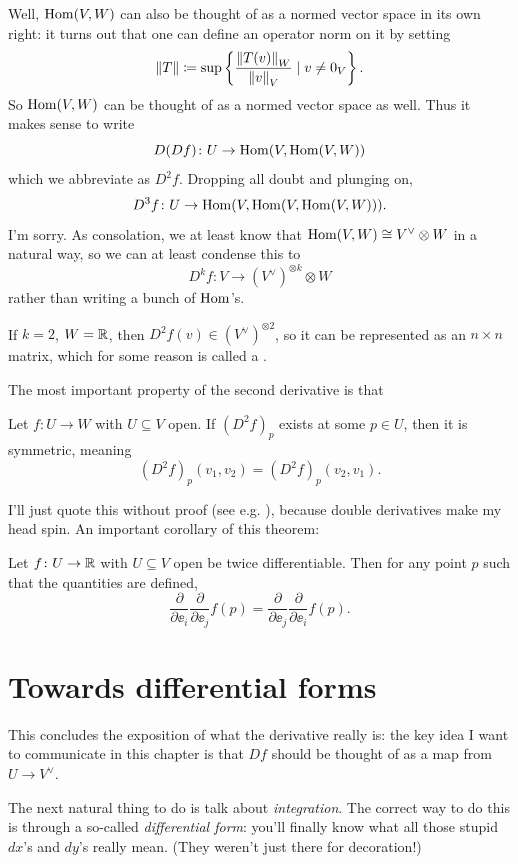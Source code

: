 Well, $\operatorname{Hom}(V,W)$ can also be thought of as a normed vector space in its own right:
it turns out that one can define an operator norm on it by setting
\[ \left\lVert T \right\rVert \coloneqq \sup \left\{ \frac{\left\lVert T(v) \right\rVert_W}{\left\lVert v \right\rVert_V} \mid v \neq 0_V \right\}. \]
So $\operatorname{Hom}(V,W)$ can be thought of as a normed vector space as well.
Thus it makes sense to write
\[ D(Df) \colon U \to \operatorname{Hom}(V,\operatorname{Hom}(V,W)) \]
which we abbreviate as $D^2 f$. Dropping all doubt and plunging on,
\[ D^3f \colon U \to \operatorname{Hom}(V, \operatorname{Hom}(V,\operatorname{Hom}(V,W))). \]
I'm sorry.
As consolation, we at least know that $\operatorname{Hom}(V,W) \cong V^\vee \otimes W$ in a natural way,
so we can at least condense this to
\[ D^kf \colon V \to (V^\vee)^{\otimes k} \otimes W \]
rather than writing a bunch of $\operatorname{Hom}$'s.
\begin{remark}
	If $k=2$, $W = \mathbb R$, then $D^2f(v) \in (V^\vee)^{\otimes 2}$,
	so it can be represented as an $n \times n$ matrix,
	which for some reason is called a .
\end{remark}
The most important property of the second derivative is that
\begin{theorem}
	[Symmetry of $D^2 f$]
	Let $f \colon U \to W$ with $U \subseteq V$ open.
	If $(D^2f)_p$ exists at some $p \in U$, then it is symmetric, meaning
	\[ (D^2f)_p(v_1, v_2) = (D^2f)_p(v_2, v_1). \]
\end{theorem}
I'll just quote this without proof (see e.g. \cite[\S5, theorem 16]{ref:pugh}),
because double derivatives make my head spin.
An important corollary of this theorem:
\begin{corollary}
	Let $f \colon U \to \mathbb R$ with $U \subseteq V$ open be twice differentiable.
	Then for any point $p$ such that the quantities are defined,
	\[
		\frac{\partial}{\partial \ee_i}
		\frac{\partial}{\partial \ee_j}
		f(p)
		=
		\frac{\partial}{\partial \ee_j}
		\frac{\partial}{\partial \ee_i}
		f(p).
	\]
\end{corollary}

\section{Towards differential forms}
This concludes the exposition of what the derivative really is:
the key idea I want to communicate in this chapter is that $Df$
should be thought of as a map from $U \to V^\vee$.

The next natural thing to do is talk about \emph{integration}.
The correct way to do this is through a so-called \emph{differential form}:
you'll finally know what all those stupid $dx$'s and $dy$'s really mean.
(They weren't just there for decoration!)

